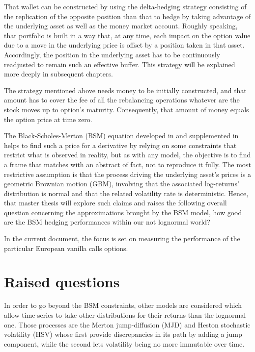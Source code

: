 \documentclass[a4paper, 12pt]{report}
\begin{document}
That wallet can be constructed by using the delta-hedging strategy consisting of the replication of the opposite position than that to hedge by taking advantage of the underlying asset as well as the money market account.
Roughly speaking, that portfolio is built in a way that, at any time, each impact on the option value due to a move in the underlying price is offset by a position taken in that asset.
Accordingly, the position in the underlying asset has to be continuously readjusted to remain such an effective buffer.
This strategy will be explained more deeply in subsequent chapters.

The strategy mentioned above needs money to be initially constructed, and that amount has to cover the fee of all the rebalancing operations whatever are the stock moves up to option's maturity.
Consequently, that amount of money equals the option price at time zero.

The Black-Scholes-Merton (BSM) equation developed in \citet{bs} and supplemented in \citet{merton73} helps to find such a price for a derivative by relying on some constraints that restrict what is observed in reality, but as with any model, the objective is to find a frame that matches with an abstract of fact, not to reproduce it fully.
The most restrictive assumption is that the process driving the underlying asset's prices is a geometric Brownian motion (GBM), involving that the associated log-returns' distribution is normal and that the related volatility rate is deterministic.
Hence, that master thesis will explore such claims and raises the following overall question concerning the approximations brought by the BSM model, how good are the BSM hedging performances within our not lognormal world?

In the current document, the focus is set on measuring the performance of the particular  European vanilla calls options.


\section{Raised questions}
\label{sec:Introduction:raised}

In order to go beyond the BSM constraints, other models are considered which allow time-series to take other distributions for their returns than the lognormal one.
Those processes are the Merton jump-diffusion (MJD) and Heston stochastic volatility (HSV) whose first provide discrepancies in its path by adding a jump component, while the second lets volatility being no more immutable over time.
\end{document}
